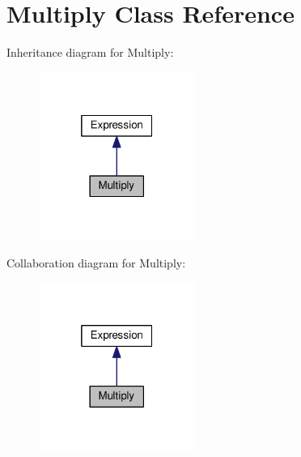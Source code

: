\hypertarget{classMultiply}{}\section{Multiply Class Reference}
\label{classMultiply}


Inheritance diagram for Multiply\+:\nopagebreak
\begin{figure}[H]
\begin{center}
\leavevmode
\includegraphics[width=145pt]{classMultiply__inherit__graph}
\end{center}
\end{figure}


Collaboration diagram for Multiply\+:\nopagebreak
\begin{figure}[H]
\begin{center}
\leavevmode
\includegraphics[width=145pt]{classMultiply__coll__graph}
\end{center}
\end{figure}
